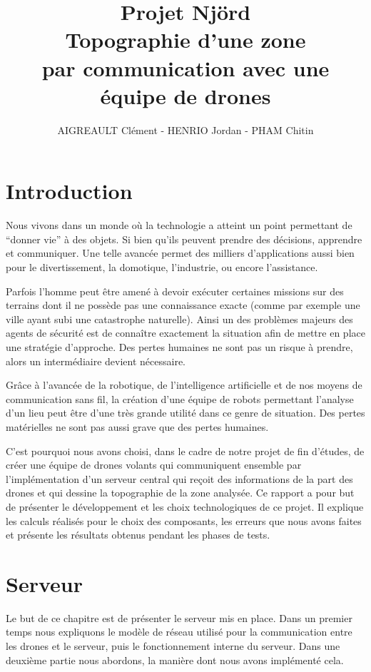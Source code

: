 \documentclass[a4paper,10pt]{report}
\title{\textbf{Projet Njörd}\\ Topographie d'une zone \\ par communication avec 
une équipe de drones}
\author{AIGREAULT Clément - HENRIO Jordan - PHAM Chitin}
\begin{document}
  \maketitle

  \chapter*{Introduction}
    Nous vivons dans un monde où la technologie a atteint un point permettant 
de “donner vie” à des objets. Si bien qu’ils peuvent prendre des décisions, 
apprendre et communiquer. Une telle avancée permet des milliers d’applications 
aussi bien pour le divertissement, la domotique, l’industrie, ou encore 
l’assistance.
    
    Parfois l’homme peut être amené à devoir exécuter certaines missions sur 
des terrains dont il ne possède pas une connaissance exacte (comme par exemple 
une ville ayant subi une catastrophe naturelle). Ainsi un des problèmes majeurs 
des agents de sécurité est de connaître exactement la situation afin de mettre 
en place une stratégie d’approche. Des pertes humaines ne sont pas un risque à 
prendre, alors un intermédiaire devient nécessaire. 

    Grâce à l'avancée de la robotique, de l'intelligence artificielle et de nos 
moyens de communication sans fil, la création d’une équipe de robots permettant 
l’analyse d’un lieu peut être d’une très grande utilité dans ce genre de 
situation. Des pertes matérielles ne sont pas aussi grave que des pertes 
humaines. 

  C'est pourquoi nous avons choisi, dans le cadre de notre projet de fin 
d'études, de créer une équipe de drones volants qui communiquent ensemble par 
l'implémentation d'un serveur central qui reçoit des informations de la part 
des drones et qui dessine la topographie de la zone analysée. Ce rapport a pour 
but de présenter le développement et les choix technologiques de ce projet. Il 
explique les calculs réalisés pour le choix des composants, les erreurs que 
nous avons faites et présente les résultats obtenus pendant les phases de tests.
  
  \tableofcontents
  
  \chapter{Serveur}
    Le but de ce chapitre est de présenter le serveur mis en place. Dans un 
premier temps nous expliquons le modèle de réseau utilisé pour la communication 
entre les drones et le serveur, puis le fonctionnement interne du serveur. Dans 
une deuxième partie nous abordons, la manière dont nous avons implémenté cela.
\end{document}
